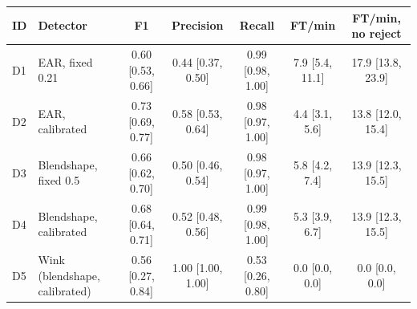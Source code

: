 \begin{tabular}{llccccc}
\toprule
ID & Detector & F1 & Precision & Recall & FT/min & FT/min, no reject \\
\midrule
D1 & EAR, fixed 0.21 & 0.60 [0.53, 0.66] & 0.44 [0.37, 0.50] & 0.99 [0.98, 1.00] & 7.9 [5.4, 11.1] & 17.9 [13.8, 23.9] \\
D2 & EAR, calibrated & 0.73 [0.69, 0.77] & 0.58 [0.53, 0.64] & 0.98 [0.97, 1.00] & 4.4 [3.1, 5.6] & 13.8 [12.0, 15.4] \\
D3 & Blendshape, fixed 0.5 & 0.66 [0.62, 0.70] & 0.50 [0.46, 0.54] & 0.98 [0.97, 1.00] & 5.8 [4.2, 7.4] & 13.9 [12.3, 15.5] \\
D4 & Blendshape, calibrated & 0.68 [0.64, 0.71] & 0.52 [0.48, 0.56] & 0.99 [0.98, 1.00] & 5.3 [3.9, 6.7] & 13.9 [12.3, 15.5] \\
D5 & Wink (blendshape, calibrated) & 0.56 [0.27, 0.84] & 1.00 [1.00, 1.00] & 0.53 [0.26, 0.80] & 0.0 [0.0, 0.0] & 0.0 [0.0, 0.0] \\
\bottomrule
\end{tabular}
